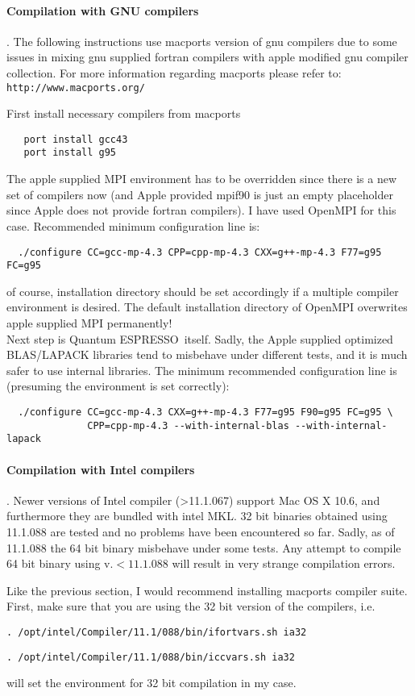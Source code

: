 \documentclass[12pt,a4paper]{article}
\def\qe{{\sc Quantum ESPRESSO}}
\begin{document}
\paragraph{Compilation with GNU compilers}.
The following instructions use macports version of gnu compilers due to some
issues in mixing gnu supplied fortran compilers with apple modified gnu compiler
collection. For more information regarding macports please refer to:
\texttt{http://www.macports.org/}  

First install necessary compilers from macports
\begin{verbatim}
   port install gcc43
   port install g95
\end{verbatim}
The apple supplied MPI environment has to be overridden since there is
a new set of compilers now (and Apple provided mpif90 is just an empty 
placeholder since Apple does not provide fortran compilers). I have used
OpenMPI for this case. Recommended minimum configuration line is:
\begin{verbatim}
  ./configure CC=gcc-mp-4.3 CPP=cpp-mp-4.3 CXX=g++-mp-4.3 F77=g95 FC=g95
\end{verbatim}
of course, installation directory should be set accordingly if a multiple
compiler environment is desired. The default installation directory of 
OpenMPI overwrites apple supplied MPI permanently!\\
Next step is \qe\ itself. Sadly, the Apple supplied optimized BLAS/LAPACK
libraries tend to misbehave under different tests, and it is much safer to
use internal libraries. The minimum recommended configuration
line is (presuming the environment is set correctly):
\begin{verbatim}
  ./configure CC=gcc-mp-4.3 CXX=g++-mp-4.3 F77=g95 F90=g95 FC=g95 \
              CPP=cpp-mp-4.3 --with-internal-blas --with-internal-lapack
\end{verbatim}
\paragraph{Compilation with Intel compilers}.
Newer versions of Intel compiler (>11.1.067) support Mac OS X 10.6, and furthermore they are
bundled with intel MKL. 32 bit binaries obtained using 11.1.088 are tested and no problems
have been encountered so far. Sadly, as of 11.1.088 the 64 bit binary misbehave 
under some tests. Any attempt to compile 64 bit binary using v.$<11.1.088$ will result in
very strange compilation errors.   

Like the previous section, I would recommend installing macports compiler suite. 
First, make sure that you are using the 32 bit version of the compilers,
i.e.  
\begin{verbatim}
. /opt/intel/Compiler/11.1/088/bin/ifortvars.sh ia32
\end{verbatim}
\begin{verbatim}
. /opt/intel/Compiler/11.1/088/bin/iccvars.sh ia32
\end{verbatim}
will set the environment for 32 bit compilation in my case. 
\end{document}

